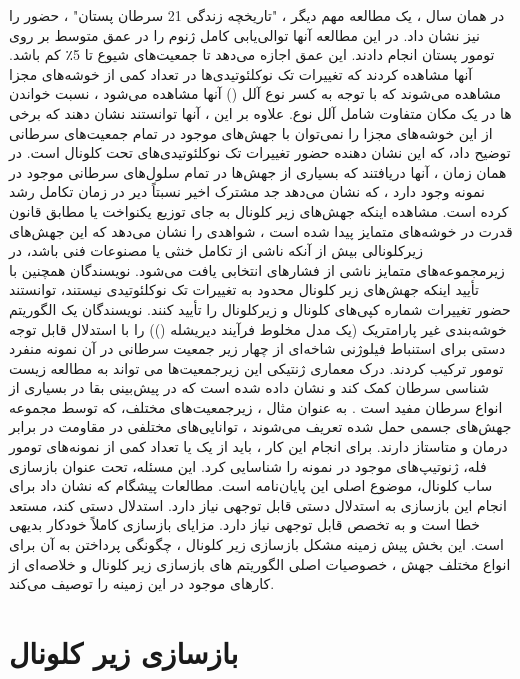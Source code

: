 در همان سال ، یک مطالعه مهم دیگر ، "تاریخچه زندگی 21 سرطان پستان" \cite{nik2012life}، حضور  را نیز نشان داد. در این مطالعه آنها توالی‌یابی کامل ژنوم را در عمق متوسط  بر روی تومور پستان  انجام دادند. این عمق اجازه می‌دهد تا جمعیت‌های شیوع تا 5٪ کم باشد. آنها مشاهده کردند که تغییرات تک نوکلئوتیدی‌ها در تعداد کمی از خوشه‌های مجزا مشاهده می‌شوند که با توجه به کسر نوع آلل () آنها مشاهده می‌شود ، نسبت خواندن ها در یک مکان متفاوت شامل آلل نوع. علاوه بر این ، آنها توانستند نشان دهند که برخی از این خوشه‌های مجزا را نمی‌توان با جهش‌های موجود در تمام جمعیت‌های سرطانی توضیح داد، که این نشان دهنده حضور تغییرات تک نوکلئوتیدی‌های تحت کلونال است. در همان زمان ، آنها دریافتند که بسیاری از جهش‌ها در تمام سلول‌های سرطانی موجود در نمونه وجود دارد ، که نشان می‌دهد جد مشترک اخیر نسبتاً دیر در زمان تکامل رشد کرده است. مشاهده اینکه جهش‌های زیر کلونال به جای توزیع یکنواخت یا مطابق قانون قدرت در خوشه‌های متمایز پیدا شده است ، شواهدی را نشان می‌دهد که این جهش‌های زیرکلونالی بیش از آنکه ناشی از تکامل خنثی یا مصنوعات فنی باشد، در زیرمجموعه‌های متمایز ناشی از فشارهای انتخابی یافت می‌شود. نویسندگان همچنین با تأیید اینکه جهش‌های زیر کلونال محدود به تغییرات تک نوکلئوتیدی  نیستند، توانستند حضور تغییرات شماره کپی‌های کلونال و زیرکلونال را تأیید کنند. نویسندگان یک الگوریتم خوشه‌بندی غیر پارامتریک (یک مدل مخلوط فرآیند دیریشله ()) را با استدلال قابل توجه دستی برای استنباط فیلوژنی شاخه‌ای از چهار زیر جمعیت سرطانی در آن نمونه منفرد تومور ترکیب کردند. درک معماری ژنتیکی این زیرجمعیت‌ها می تواند به مطالعه زیست شناسی سرطان کمک کند و نشان داده شده است که در پیش‌بینی بقا در بسیاری از انواع سرطان مفید است \cite{andor2016pan}. به عنوان مثال ، زیرجمعیت‌های مختلف، که توسط مجموعه جهش‌های جسمی حمل شده تعریف می‌شوند ، توانایی‌های مختلفی در مقاومت در برابر درمان و متاستاز دارند. برای انجام این کار ، باید از یک یا تعداد کمی از نمونه‌های تومور فله، ژنوتیپ‌های موجود در نمونه را شناسایی کرد. این مسئله، تحت عنوان بازسازی ساب کلونال، موضوع اصلی این پایان‌نامه است. مطالعات پیشگام که نشان داد  برای انجام این بازسازی به استدلال دستی قابل توجهی نیاز دارد. استدلال دستی کند، مستعد خطا است و به تخصص قابل توجهی نیاز دارد. مزایای بازسازی کاملاً خودکار بدیهی است. این بخش پیش زمینه مشکل بازسازی زیر کلونال ، چگونگی پرداختن به آن برای انواع مختلف جهش ، خصوصیات اصلی الگوریتم های بازسازی زیر کلونال و خلاصه‌ای از کارهای موجود در این زمینه را توصیف می‌کند.


\section{بازسازی زیر کلونال }

